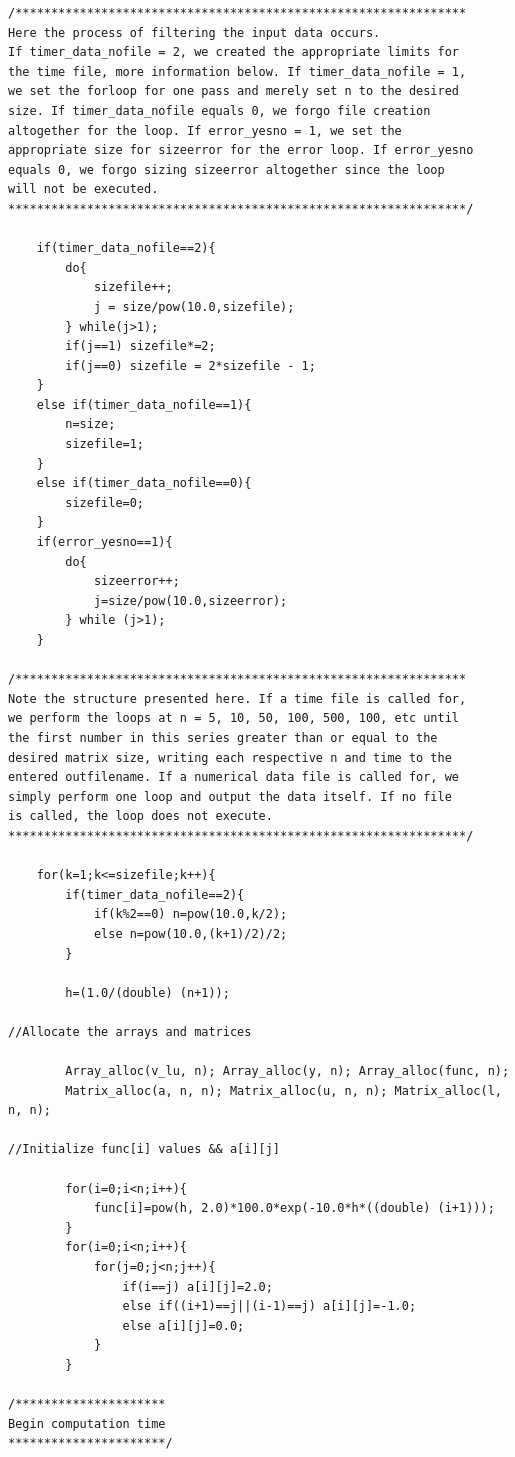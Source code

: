 \documentclass[11pt,a4paper]{article}
\begin{document}
\begin{lstlisting}[title={LUdecomp.cpp}]
/***************************************************************
Here the process of filtering the input data occurs.
If timer_data_nofile = 2, we created the appropriate limits for
the time file, more information below. If timer_data_nofile = 1, 
we set the forloop for one pass and merely set n to the desired 
size. If timer_data_nofile equals 0, we forgo file creation 
altogether for the loop. If error_yesno = 1, we set the 
appropriate size for sizeerror for the error loop. If error_yesno
equals 0, we forgo sizing sizeerror altogether since the loop 
will not be executed.
****************************************************************/
	
	if(timer_data_nofile==2){
		do{
			sizefile++;
			j = size/pow(10.0,sizefile);
		} while(j>1);
		if(j==1) sizefile*=2;
		if(j==0) sizefile = 2*sizefile - 1;
	}
	else if(timer_data_nofile==1){
		n=size;
		sizefile=1;
	}
	else if(timer_data_nofile==0){
		sizefile=0;
	}
	if(error_yesno==1){
		do{
			sizeerror++;
			j=size/pow(10.0,sizeerror);
		} while (j>1);
	}
		
/***************************************************************
Note the structure presented here. If a time file is called for, 
we perform the loops at n = 5, 10, 50, 100, 500, 100, etc until 
the first number in this series greater than or equal to the 
desired matrix size, writing each respective n and time to the
entered outfilename. If a numerical data file is called for, we
simply perform one loop and output the data itself. If no file
is called, the loop does not execute.
****************************************************************/
	
	for(k=1;k<=sizefile;k++){
		if(timer_data_nofile==2){
			if(k%2==0) n=pow(10.0,k/2);
			else n=pow(10.0,(k+1)/2)/2;
		}
	
		h=(1.0/(double) (n+1));
	
//Allocate the arrays and matrices

		Array_alloc(v_lu, n); Array_alloc(y, n); Array_alloc(func, n);
		Matrix_alloc(a, n, n); Matrix_alloc(u, n, n); Matrix_alloc(l, n, n);

//Initialize func[i] values && a[i][j]

		for(i=0;i<n;i++){
			func[i]=pow(h, 2.0)*100.0*exp(-10.0*h*((double) (i+1)));
		}
		for(i=0;i<n;i++){
			for(j=0;j<n;j++){
				if(i==j) a[i][j]=2.0;
				else if((i+1)==j||(i-1)==j) a[i][j]=-1.0;
				else a[i][j]=0.0;
			}
		}

/*********************
Begin computation time
**********************/


\end{lstlisting}
\end{document}

